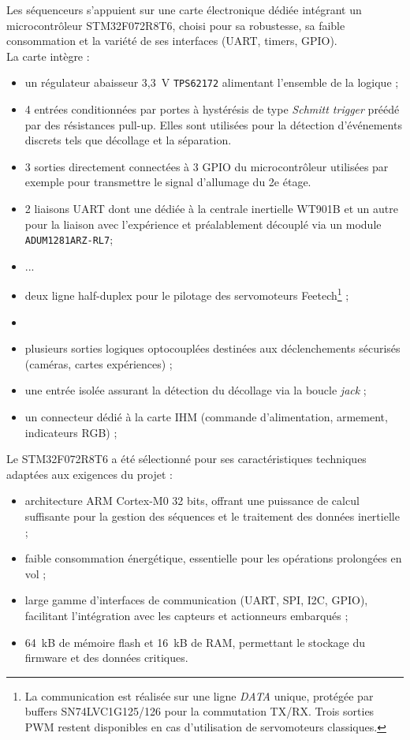 Les séquenceurs s’appuient sur une carte électronique dédiée intégrant un microcontrôleur STM32F072R8T6, choisi pour sa
robustesse, sa faible consommation et la variété de ses interfaces (UART, timers, GPIO). \\

La carte intègre :
\begin{itemize}
    \item un régulateur abaisseur 3,3~V \verb|TPS62172| alimentant l’ensemble de la logique ;
    \item 4 entrées conditionnées par portes à hystérésis de type \textit{Schmitt trigger} préédé par des résistances
    pull-up. Elles sont utilisées pour la détection d’événements discrets tels que décollage et la séparation.  
    \item 3 sorties directement connectées à 3 GPIO du microcontrôleur utilisées par exemple pour transmettre le signal
    d'allumage du 2e étage.
    \item 2 liaisons UART dont une dédiée à la centrale inertielle WT901B et un autre pour la liaison avec l'expérience et
    préalablement découplé via un module \verb|ADUM1281ARZ-RL7|;
    \item ...
    \item deux ligne half-duplex pour le pilotage des servomoteurs Feetech\footnote{La communication est réalisée sur une ligne
    \textit{DATA} unique, protégée par buffers SN74LVC1G125/126 pour la commutation TX/RX. Trois sorties PWM restent
    disponibles en cas d’utilisation de servomoteurs classiques.} ;
    \item 
    \item plusieurs sorties logiques optocouplées destinées aux déclenchements sécurisés (caméras, cartes expériences) ;
    \item une entrée isolée assurant la détection du décollage via la boucle \textit{jack} ;
    \item un connecteur dédié à la carte IHM (commande d’alimentation, armement, indicateurs RGB) ;
\end{itemize}

Le STM32F072R8T6 a été sélectionné pour ses caractéristiques techniques adaptées aux exigences du projet :
\begin{itemize}
    \item architecture ARM Cortex-M0 32 bits, offrant une puissance de calcul suffisante pour la gestion des séquences et
    le traitement des données inertielle ;
    \item faible consommation énergétique, essentielle pour les opérations prolongées en vol ;
    \item large gamme d’interfaces de communication (UART, SPI, I2C, GPIO), facilitant l’intégration avec les capteurs et
    actionneurs embarqués ;
    \item 64~kB de mémoire flash et 16~kB de RAM, permettant le stockage du firmware et des données critiques. \\
\end{itemize}

